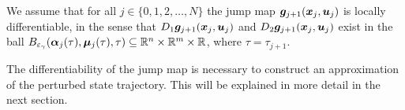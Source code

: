 \documentclass[../DC2019003Bouma.tex]{subfiles}
\begin{document}
\begin{sloppypar}
\begin{myass}\label{ass:jump}
We assume that for all $j \in \{0,1,2,\dots,N\}$ the jump map ${\boldsymbol{g}}_{j+1}({\boldsymbol{x}}_j,{\boldsymbol{u}}_j)$ is locally differentiable, in the sense that $D_1{\boldsymbol{g}}_{j+1}({\boldsymbol{x}}_j,{\boldsymbol{u}}_j)$ and $D_2{\boldsymbol{g}}_{j+1}({\boldsymbol{x}}_j,{\boldsymbol{u}}_j)$ exist in the ball $B_{\varepsilon_{\gamma}}(\boldsymbol{\alpha}_j(\tau),\boldsymbol{\mu}_j(\tau),\tau)\subseteq \mathbb{R}^n \times \mathbb{R}^m \times \mathbb{R}$, where $\tau = \tau_{j+1}$.
\end{myass}
\end{sloppypar}

The differentiability of the jump map is necessary to construct an approximation of the perturbed state trajectory. This will be explained in more detail in the next section.
\end{document}
